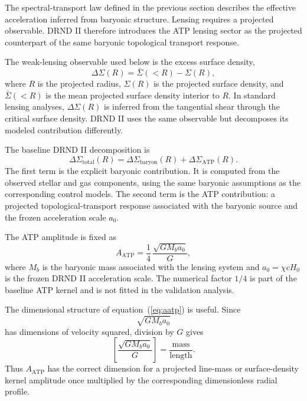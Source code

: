 \documentclass[12pt]{iopart}
\begin{document}
The spectral-transport law defined in the previous section describes the effective acceleration inferred from baryonic structure. Lensing requires a projected observable. DRND II therefore introduces the ATP lensing sector as the projected counterpart of the same baryonic topological transport response.

The weak-lensing observable used below is the excess surface density,
\begin{equation}
\Delta\Sigma(R)
=
\bar{\Sigma}(<R)-\Sigma(R),
\label{eq:delta_sigma_def}
\end{equation}
where \(R\) is the projected radius, \(\Sigma(R)\) is the projected surface density, and \(\bar{\Sigma}(<R)\) is the mean projected surface density interior to \(R\). In standard lensing analyses, \(\Delta\Sigma(R)\) is inferred from the tangential shear through the critical surface density. DRND II uses the same observable but decomposes its modeled contribution differently.

The baseline DRND II decomposition is
\begin{equation}
\Delta\Sigma_{\mathrm{total}}(R)
=
\Delta\Sigma_{\mathrm{baryon}}(R)
+
\Delta\Sigma_{\mathrm{ATP}}(R).
\label{eq:delta_sigma_total}
\end{equation}
The first term is the explicit baryonic contribution. It is computed from the observed stellar and gas components, using the same baryonic assumptions as the corresponding control models. The second term is the ATP contribution: a projected topological-transport response associated with the baryonic source and the frozen acceleration scale \(a_0\).

The ATP amplitude is fixed as
\begin{equation}
A_{\mathrm{ATP}}
=
\frac14\,
\frac{\sqrt{GM_ba_0}}{G},
\label{eq:aatp}
\end{equation}
where \(M_b\) is the baryonic mass associated with the lensing system and \(a_0=\chi cH_0\) is the frozen DRND II acceleration scale. The numerical factor \(1/4\) is part of the baseline ATP kernel and is not fitted in the validation analysis.

The dimensional structure of equation~(\ref{eq:aatp}) is useful. Since
\begin{equation}
\sqrt{GM_ba_0}
\end{equation}
has dimensions of velocity squared, division by \(G\) gives
\begin{equation}
\left[
\frac{\sqrt{GM_ba_0}}{G}
\right]
=
\frac{\mathrm{mass}}{\mathrm{length}}.
\end{equation}
Thus \(A_{\mathrm{ATP}}\) has the correct dimension for a projected line-mass or surface-density kernel amplitude once multiplied by the corresponding dimensionless radial profile.
\end{document}
